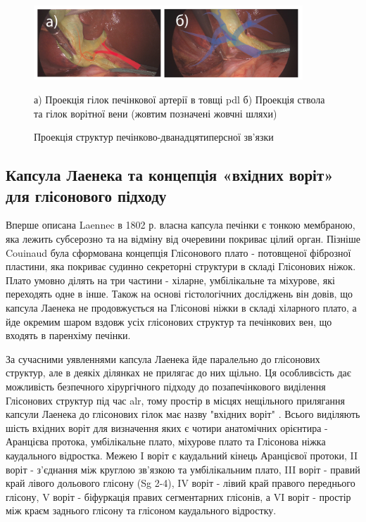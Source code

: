 \begin{refsection}
\begin{figure}[htbp]
\caption{Проекція структур печінково-дванадцятиперсної зв'язки}

\includegraphics[width=0.9\textwidth]{Illustrations/Chapter_01/External landmarks_PDL.png}
\label{fig:External_landmarks_PDL}

\small
а) Проекція гілок печінкової артерії в товщі \acrshort{pdl} б) Проекція ствола та гілок ворітної вени (жовтим позначені жовчні шляхи)
\end{figure}


\subsection{Капсула Лаенека та концепція «вхідних воріт» для глісонового підходу}

Вперше описана Laennec в 1802 р. власна капсула печінки є тонкою мембраною, яка лежить субсерозно та на відміну від очеревини покриває цілий орган. Пізніше Couinaud була сформована концепція Глісонового плато - потовщеної фіброзної пластини, яка покриває судинно секреторні структури в складі Глісонових ніжок. Плато умовно ділять на три частини - хіларне, умбілікальне та міхурове, які переходять одне в інше. Також на основі гістологічних досліджень він довів, що капсула Лаенека не продовжується на Глісонові ніжки в складі хіларного плато, а йде окремим шаром вздовж усіх глісонових структур та печінкових вен, що входять в паренхіму печінки.

За сучасними уявленнями капсула Лаенека йде паралельно до глісонових структур, але в деякіх ділянках не прилягає до них щільно. Ця особливсість дає можливість безпечного хірургічного підходу до позапечінкового виділення Глісонових структур під час \acrshort{alr}, тому простір в місцях нещільного прилягання капсули Лаенека до глісонових гілок має назву "вхідних воріт" \cite{Sugioka2017}. Всього виділяють шість вхідних воріт для визначення яких є чотири анатомічних орієнтира - Аранцієва протока, умбілікальне плато, міхурове плато та Глісонова ніжка каудального відростка. Межею I воріт є каудальний кінець Аранцієвої протоки, II воріт - з'єднання між круглою зв'язкою та умбілікальним плато, III воріт - правий край лівого дольового глісону (Sg 2-4), IV воріт - лівий край правого переднього глісону, V воріт - біфуркація правих сегментарних глісонів, а VI воріт - простір між краєм заднього глісону та глісоном каудального відростку. 


\end{refsection}
